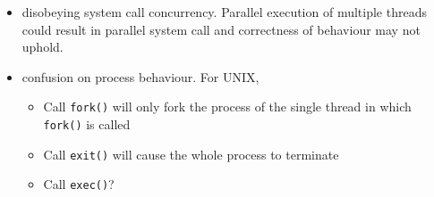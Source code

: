 \documentclass[11pt]{article}
\theoremstyle{definition}
\begin{document}
\begin{itemize}[itemsep=0pt]
  \item disobeying system call concurrency. Parallel execution of multiple threads could result in parallel system call and correctness of behaviour may not uphold.
  \item confusion on process behaviour. For UNIX,
  \begin{itemize}[itemsep=0pt]
    \item Call \texttt{fork()} will only fork the process of the single thread in which \texttt{fork()} is called
    \item Call \texttt{exit()} will cause the whole process to terminate
    \item Call \texttt{exec()}?
  \end{itemize}
\end{itemize}
\end{document}
